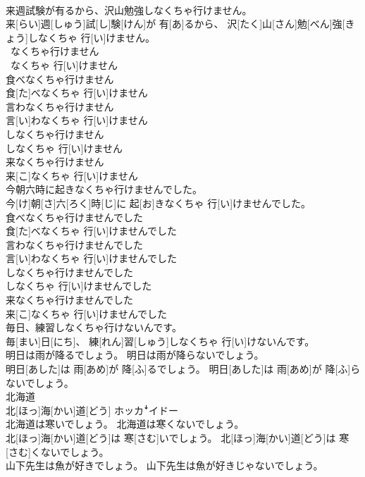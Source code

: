 \documentclass[8pt]{extreport}
\begin{document}
\begin{CJK}{UTF8}{min}
\\	来週試験が有るから、沢山勉強しなくちゃ行けません。	
\\	来[らい]週[しゅう]試[し]験[けん]が 有[あ]るから、 沢[たく]山[さん]勉[べん]強[きょう]しなくちゃ 行[い]けません。
\\	~なくちゃ行けません	
\\	~なくちゃ 行[い]けません
\\	食べなくちゃ行けません	
\\	食[た]べなくちゃ 行[い]けません
\\	言わなくちゃ行けません	
\\	言[い]わなくちゃ 行[い]けません
\\	しなくちゃ行けません	
\\	しなくちゃ 行[い]けません
\\	来なくちゃ行けません	
\\	来[こ]なくちゃ 行[い]けません
\\	今朝六時に起きなくちゃ行けませんでした。	
\\	今[け]朝[さ]六[ろく]時[じ]に 起[お]きなくちゃ 行[い]けませんでした。
\\	食べなくちゃ行けませんでした	
\\	食[た]べなくちゃ 行[い]けませんでした
\\	言わなくちゃ行けませんでした	
\\	言[い]わなくちゃ 行[い]けませんでした
\\	しなくちゃ行けませんでした	
\\	しなくちゃ 行[い]けませんでした
\\	来なくちゃ行けませんでした	
\\	来[こ]なくちゃ 行[い]けませんでした
\\	毎日、練習しなくちゃ行けないんです。	
\\	毎[まい]日[にち]、 練[れん]習[しゅう]しなくちゃ 行[い]けないんです。
\\	明日は雨が降るでしょう。 明日は雨が降らないでしょう。	
\\	明日[あした]は 雨[あめ]が 降[ふ]るでしょう。 明日[あした]は 雨[あめ]が 降[ふ]らないでしょう。
\\	北海道	
\\	北[ほっ]海[かい]道[どう]	ホッカꜜイドー
\\	北海道は寒いでしょう。 北海道は寒くないでしょう。	
\\	北[ほっ]海[かい]道[どう]は 寒[さむ]いでしょう。 北[ほっ]海[かい]道[どう]は 寒[さむ]くないでしょう。
\\	山下先生は魚が好きでしょう。 山下先生は魚が好きじゃないでしょう。	

\end{CJK}
\end{document}
